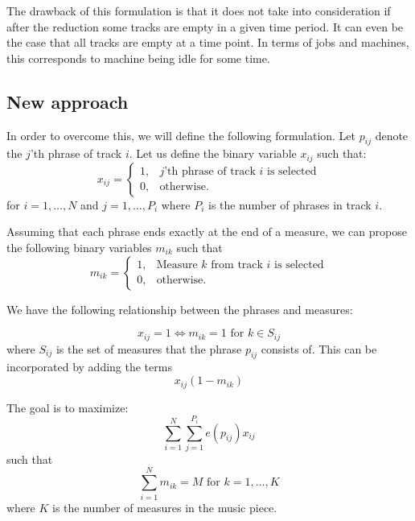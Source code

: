 \documentclass[11pt,a4paper]{article}
\begin{document}
The drawback of this formulation is that it does not take into consideration if after the reduction some tracks are empty in a given time period. It can even be the case that all tracks are empty at a time point. In terms of jobs and machines, this corresponds to machine being idle for some time. 

\subsection{New approach}
In order to overcome this, we will define the following formulation. Let $ p_{ij} $ denote the $ j $'th phrase of track $ i $. Let us define the binary variable $x_{ij}$ such that:
\begin{equation}
x_{ij} =   \begin{cases}%
1,      & \text{$j$'th phrase of track $i$ is selected}\\
0, & \text{otherwise.}
\end{cases}
\end{equation}
 for $ i = 1, \dots ,N $ and $ j=1, \dots ,P_i  $ where $P_i$ is the number of phrases in track $i$.


Assuming that each phrase ends exactly at the end of a measure, we can propose the following binary variables $m_{ik}$ such that
\begin{equation}
m_{ik} =   \begin{cases}%
1,      & \text{Measure $k$ from track $i$ is selected}\\
0, & \text{otherwise.}
\end{cases}
\end{equation}

We have the following relationship between the phrases and measures:
 
\begin{equation}\label{eq:phrasemeasure}
x_{ij} = 1 \iff m_{ik}=1 \mbox{ for } k \in S_{ij}
\end{equation}
 where $S_{ij}$ is the set of measures that the phrase $p_{ij}$ consists of. This can be incorporated by adding the terms 
 \begin{equation}
 x_{ij}(1-m_{ik})
 \end{equation}
 
 The goal is to maximize:
 \begin{equation}
 \sum_{i=1}^N\sum_{j=1}^{P_i} e(p_{ij})x_{ij}
 \end{equation}
 such that
 \begin{equation}\label{eq:mtrack}
\sum_{i=1}^N m_{ik} = M \mbox{ for }k=1,\dots, K 
\end{equation}
 where $K$ is the number of measures in the music piece. 
 
\end{document}
